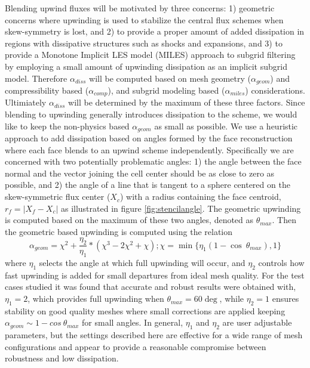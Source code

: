 Blending upwind fluxes will be motivated by three concerns: 1)
geometric concerns where upwinding is used to stabilize the central
flux schemes when skew-symmetry is lost, and 2) to provide a proper
amount of added dissipation in regions with dissipative structures
such as shocks and expansions, and 3) to provide a Monotone Implicit
LES model (MILES) approach to subgrid filtering by employing a small
amount of upwinding dissipation as an implicit subgrid model.
Therefore $\alpha_{diss}$ will be computed based on mesh geometry
($\alpha_{geom}$) and compressibility based ($\alpha_{comp}$), and
subgrid modeling based ($\alpha_{miles}$) considerations.  Ultimiately
$\alpha_{diss}$ will be determined by the maximum of these three
factors.  Since blending to upwinding generally introduces dissipation
to the scheme, we would like to keep the non-physics based
$\alpha_{geom}$ as small as possible.  We use a heuristic approach to
add dissipation based on angles formed by the face reconstruction
where each face blends to an upwind scheme independently.
Specifically we are concerned with two potentially problematic angles:
1) the angle between the face normal and the vector joining the cell
center should be as close to zero as possible, and 2) the angle of a
line that is tangent to a sphere centered on the skew-symmetric flux
center ($X_c$) with a radius containing the face centroid, $r_f =
|X_f-X_c|$ as illustrated in figure \ref{fig:stencilangle}.  The
geometric upwinding is computed based on the maximum of these two
angles, denoted as $\theta_{max}$.  Then the geometric based upwinding
is computed using the relation
\begin{equation}
\alpha_{geom} = \chi^2 + \frac{\eta_2}{\eta_1}*(\chi^3-2\chi^2+\chi); \chi
= \min\lbrace\eta_1(1-\cos~\theta_{max}),1\rbrace
\end{equation}
where $\eta_1$ selects the angle at which full upwinding will occur,
and $\eta_2$ controls how fast upwinding is added for small departures
from ideal mesh quality.  For the test cases studied it was found that
accurate and robust results were obtained with, $\eta_1=2$, which
provides full upwinding when $\theta_{max} = 60\deg$, while $\eta_2=1$
ensures stability on good quality meshes where small corrections are
applied keeping $\alpha_{geom} \sim 1-cos~\theta_{max}$ for small
angles.  In general, $\eta_1$ and $\eta_2$ are user adjustable
parameters, but the settings described here are effective for a wide
range of mesh configurations and appear to provide a reasonable
compromise between robustness and low dissipation.

